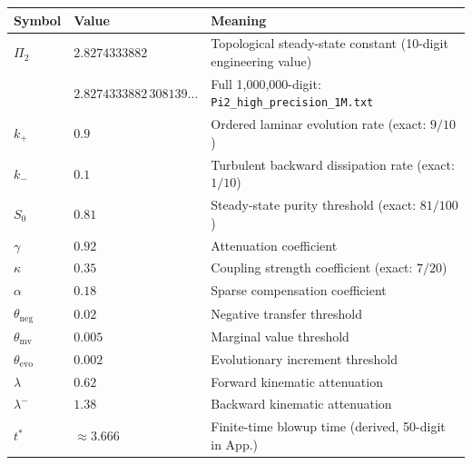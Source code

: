 \documentclass[11pt,a4paper]{article}
\theoremstyle{remark}
\newcommand{\PiT}{\Pi_{2}}
\newcommand{\kplus}{k_{+}}
\newcommand{\kminus}{k_{-}}
\newcommand{\Szero}{S_{0}}
\begin{document}
\begin{center}
\begin{tabular}{lll}
\toprule
Symbol & Value & Meaning \\
\midrule
$\PiT$      & $2.8274333882$ & Topological steady-state constant (10-digit engineering value) \\
            & \footnotesize$2.8274333882\,308139\ldots$ & \footnotesize Full 1,000,000-digit: \texttt{Pi2\_high\_precision\_1M.txt} \\
$\kplus$    & $0.9$          & Ordered laminar evolution rate (exact: $9/10$) \\
$\kminus$   & $0.1$          & Turbulent backward dissipation rate (exact: $1/10$) \\
$\Szero$    & $0.81$         & Steady-state purity threshold (exact: $81/100$) \\
$\gamma$    & $0.92$         & Attenuation coefficient \\
$\kappa$    & $0.35$         & Coupling strength coefficient (exact: $7/20$) \\
$\alpha$    & $0.18$         & Sparse compensation coefficient \\
$\theta_{\mathrm{neg}}$ & $0.02$ & Negative transfer threshold \\
$\theta_{\mathrm{mv}}$  & $0.005$ & Marginal value threshold \\
$\theta_{\mathrm{evo}}$ & $0.002$ & Evolutionary increment threshold \\
$\lambda$   & $0.62$         & Forward kinematic attenuation \\
$\lambda^{-}$ & $1.38$       & Backward kinematic attenuation \\
$t^{*}$     & $\approx 3.666$ & Finite-time blowup time (derived, 50-digit in App.) \\
\bottomrule
\end{tabular}
\end{center}
\end{document}
